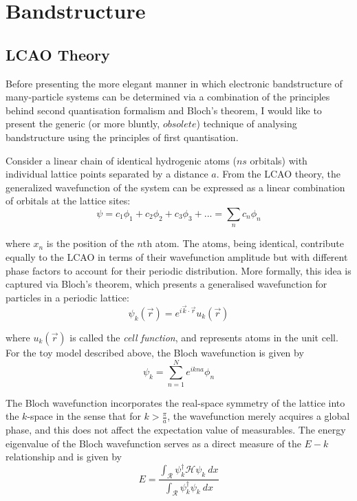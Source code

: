 \chapter{Bandstructure}


\section{LCAO Theory}
Before presenting the more elegant manner in which electronic bandstructure of many-particle systems can be determined via a combination of the principles behind second quantisation formalism and Bloch's theorem, I would like to present the generic (or more bluntly, $obsolete$) technique of analysing bandstructure using the principles of first quantisation. \par

Consider a linear chain of identical hydrogenic atoms ($ns$ orbitals) with individual lattice points separated by a distance $a$. From the LCAO theory, the generalized wavefunction of the system can be expressed as a linear combination of orbitals at the lattice sites:
\begin{equation*}
    \psi = c_{1}\phi_{1} + c_{2}\phi_{2} + c_{3}\phi_{3} + ... = \sum_{n}c_{n}\phi_{n}
\end{equation*}

where $x_{n}$ is the position of the $n$th atom. The atoms, being identical, contribute equally to the LCAO in terms of their wavefunction amplitude but with different phase factors to account for their periodic distribution. More formally, this idea is captured via Bloch's theorem, which presents a generalised wavefunction for particles in a periodic lattice:
\begin{equation*}
    \psi_{k}(\vec{r}) = e^{i\vec{k}\cdot \vec{r}}u_{k}(\vec{r})
\end{equation*}

where $u_{k}(\vec{r})$ is called the \textit{cell function}, and represents atoms in the unit cell. For the toy model described above, the Bloch wavefunction is given by
\begin{equation}
    \psi_{k} = \sum_{n=1}^{N} e^{ikna}\phi_{n}
\end{equation}

The Bloch wavefunction incorporates the real-space symmetry of the lattice into the $k$-space in the sense that for $k > \frac{\pi}{a}$, the wavefunction merely acquires a global phase, and this does not affect the expectation value of measurables. The energy eigenvalue of the Bloch wavefunction serves as a direct measure of the $E-k$ relationship and is given by
\begin{equation}
    E = \frac{\int_{\mathcal{R}} \psi_{k}^{\dagger} \mathcal{H}\psi_{k}\: dx}{\int_{\mathcal{R}} \psi_{k}^{\dagger} \psi_{k}\: dx}
\end{equation}

